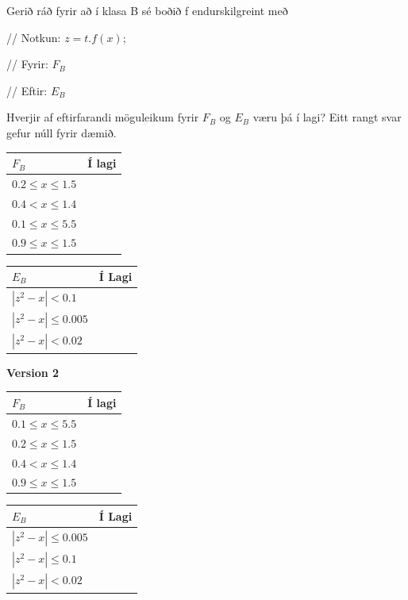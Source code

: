 \documentclass{article}
\newcommand{\bo}[1]{\textbf{#1}}
\begin{document}
    Gerið ráð fyrir að í klasa B sé boðið f endurskilgreint með


    // Notkun: $z = t.f(x);$


    // Fyrir: $F_B$


    // Eftir: $E_B$


    Hverjir af eftirfarandi möguleikum fyrir $F_B$ og $E_B$ væru þá í lagi? Eitt
    rangt svar gefur núll fyrir dæmið.

    \begin{tabularx}{\textwidth}{|X|X|}
        \hline
        $F_B$ & \bo{Í lagi} \\ \hline
        $0.2 \leq x \leq 1.5 $ & \\ \hline
        $0.4 < x \leq 1.4 $ & \\ \hline
        $0.1 \leq x \leq 5.5 $ & \\ \hline
        $0.9 \leq x \leq 1.5 $& \\ \hline
        
    \end{tabularx}

    \begin{tabularx}{\textwidth}{|X|X|}
        \hline
        $E_B$ & \bo{Í Lagi} \\ \hline
        $|z^2 - x| < 0.1 $ & \\ \hline
        $|z^2 - x| \leq 0.005 $ & \\ \hline
        $|z^2 - x| < 0.02 $ & \\ \hline
        
    \end{tabularx}


    \bo{Version 2}


    
    \begin{tabularx}{\textwidth}{|X|X|}
        \hline
        $F_B$ & \bo{Í lagi} \\ \hline
        $0.1 \leq x \leq 5.5 $ & \\ \hline
        $0.2 \leq x \leq 1.5 $ & \\ \hline
        $0.4 < x \leq 1.4 $ & \\ \hline
        $0.9 \leq x \leq 1.5 $& \\ \hline
        
    \end{tabularx}
    \begin{tabularx}{\textwidth}{|X|X|}
        \hline
        $E_B$ & \bo{Í Lagi} \\ \hline
        $|z^2 - x| \leq 0.005 $ & \\ \hline
        $|z^2 - x| \leq 0.1 $ & \\ \hline
        $|z^2 - x| < 0.02 $ & \\ \hline
        
    \end{tabularx}
\end{document}

